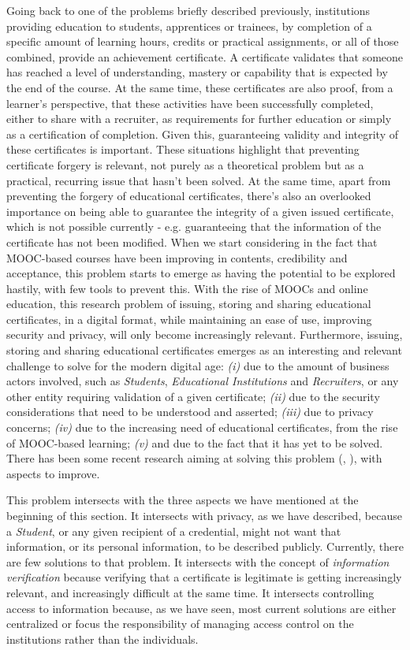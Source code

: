 Going back to one of the problems briefly described previously, institutions providing education to students, apprentices or trainees, by completion of a specific amount of learning hours, credits or practical assignments, or all of those combined, provide an achievement certificate. A certificate validates that someone has reached a level of understanding, mastery or capability that is expected by the end of the course. At the same time, these certificates are also proof, from a learner's perspective, that these activities have been successfully completed, either to share with a recruiter, as requirements for further education or simply as a certification of completion. Given this, guaranteeing validity and integrity of these certificates is important. These situations highlight that preventing certificate forgery is relevant, not purely as a theoretical problem but as a practical, recurring issue that hasn't been solved. At the same time, apart from preventing the forgery of educational certificates, there's also an overlooked importance on being able to guarantee the integrity of a given issued certificate, which is not possible currently - e.g. guaranteeing that the information of the certificate has not been modified. When we start considering in the fact that MOOC-based courses have been improving in contents, credibility and acceptance, this problem starts to emerge as having the potential to be explored hastily, with few tools to prevent this. With the rise of MOOCs and online education, this research problem of issuing, storing and sharing educational certificates, in a digital format, while maintaining an ease of use, improving security and privacy, will only become increasingly relevant. Furthermore, issuing, storing and sharing educational certificates emerges as an interesting and relevant challenge to solve for the modern digital age: \emph{(i)} due to the amount of business actors involved, such as \textit{Students}, \textit{Educational Institutions} and \textit{Recruiters}, or any other entity requiring validation of a given certificate; \emph{(ii)} due to the security considerations that need to be understood and asserted; \emph{(iii)} due to privacy concerns; \emph{(iv)} due to the increasing need of educational certificates, from the rise of MOOC-based learning; \emph{(v)} and due to the fact that it has yet to be solved. There has been some recent research aiming at solving this problem (\cite{MITCertificates}, \cite{Blockcerts}), with aspects to improve.

This problem intersects with the three aspects we have mentioned at the beginning of this section. It intersects with privacy, as we have described, because a \textit{Student}, or any given recipient of a credential, might not want that information, or its personal information, to be described publicly. Currently, there are few solutions to that problem. It intersects with the concept of \textit{information verification} because verifying that a certificate is legitimate is getting increasingly relevant, and increasingly difficult at the same time. It intersects controlling access to information because, as we have seen, most current solutions are either centralized or focus the responsibility of managing access control on the institutions rather than the individuals.

